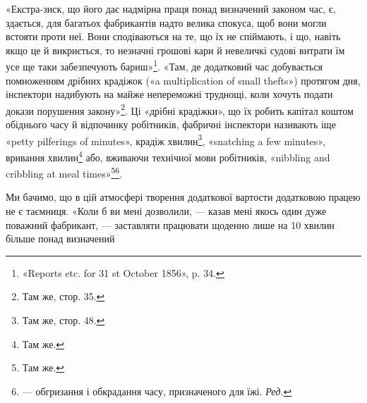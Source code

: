«Екстра-зиск, що його дає надмірна праця понад визначений
законом час, є, здається, для багатьох фабрикантів надто
велика спокуса, щоб вони могли встояти проти неї. Вони сподіваються
на те, що їх не спіймають, і що, навіть якщо це й
викриється, то незначні грошові кари й невеличкі судові витрати
їм усе ще таки забезпечують бариш»\footnote{
«Reports etc. for 31 st October 1856», p. 34.
}. «Там, де додатковий
час добувається помноженням дрібних крадіжок («a multiplication
of small thefts») протягом дня, інспектори надибують на
майже непереможні труднощі, коли хочуть подати докази порушення
закону»\footnote{
Там же, стор. 35.
}. Ці «дрібні крадіжки», що їх робить капітал
коштом обіднього часу й відпочинку робітників, фабричні інспектори
називають іще «petty pilferings of minutes», крадіж хвилин\footnote{
Там же, стор. 48.
},
«snatching a few minutes», вривання хвилин\footnote{
Там же.
} або, вживаючи технічної
мови робітників, «nibbling and cribbling at meal times»\footnote{
Там же.
}\footnote*{
— обгризання і обкрадання часу, призначеного для їжі. \emph{Ред.}
}.

Ми бачимо, що в цій атмосфері творення додаткової вартости
додатковою працею не є таємниця. «Коли б ви мені дозволили, —
казав мені якось один дуже поважний фабрикант, — заставляти
працювати щоденно лише на 10 хвилин більше понад визначений
\parbreak{}  %
